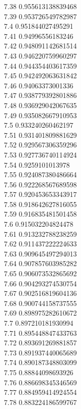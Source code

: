 {7.38	0.955613138839468\\
7.39	0.953726549782987\\
7.4	0.951844027495291\\
7.41	0.94996556183246\\
7.42	0.948091142681514\\
7.43	0.946220759960297\\
7.44	0.944354403617359\\
7.45	0.942492063631842\\
7.46	0.94063373001336\\
7.47	0.938779392801886\\
7.48	0.936929042067635\\
7.49	0.935082667910953\\
7.5	0.933240260462197\\
7.51	0.931401809881629\\
7.52	0.929567306359296\\
7.53	0.927736740114924\\
7.54	0.9259101013978\\
7.55	0.924087380486664\\
7.56	0.922268567689598\\
7.57	0.920453653343917\\
7.58	0.918642627816055\\
7.59	0.916835481501458\\
7.6	0.915032204824478\\
7.61	0.913232788238259\\
7.62	0.911437222224633\\
7.63	0.909645497294013\\
7.64	0.907857603985282\\
7.65	0.906073532865692\\
7.66	0.904293274530754\\
7.67	0.902516819604136\\
7.68	0.900744158737555\\
7.69	0.898975282610672\\
7.7	0.897210181930994\\
7.71	0.895448847433763\\
7.72	0.893691269881857\\
7.73	0.891937440065689\\
7.74	0.890187348803099\\
7.75	0.88844098693926\\
7.76	0.886698345346569\\
7.77	0.884959414924554\\
7.78	0.883224186599767\\
}
